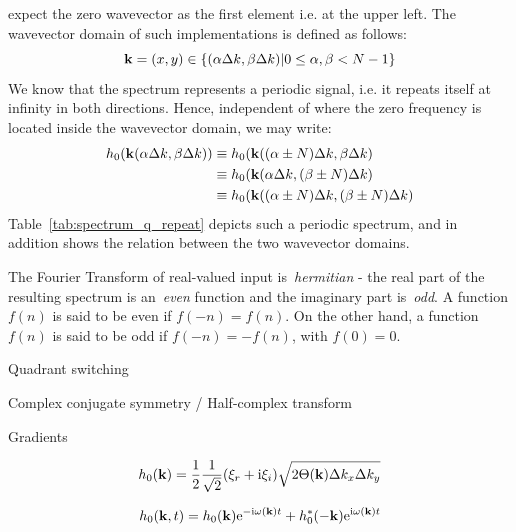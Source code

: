 expect the zero wavevector as the first element i.e. at the upper left. The wavevector domain
of such implementations is defined as follows:
\begin{equation*}
\mathbf{k} = (x,y)\in\{(\alpha\Delta k,\beta\Delta k)|
0\leq\alpha,\beta<N-1\}
\end{equation*}
We know that the spectrum represents a periodic signal, i.e. it repeats itself at infinity in both directions.
Hence, independent of where the zero frequency is located inside the wavevector domain, we may write:
\begin{align*}
 h_0(\mathbf{k}(\alpha\Delta k,\beta\Delta k)) &\equiv h_0(\mathbf{k}((\alpha\pm N)\Delta k, \beta\Delta k) \\
					     &\equiv h_0(\mathbf{k}(\alpha\Delta k, (\beta\pm N)\Delta k) \\
					     &\equiv h_0(\mathbf{k}((\alpha\pm N)\Delta k, (\beta\pm N)\Delta k)
\end{align*}
Table~\ref{tab:spectrum_q_repeat} depicts such a periodic spectrum, and in addition shows
the relation between the two wavevector domains.

The Fourier Transform of real-valued input is~\emph{hermitian} - the real part of the resulting spectrum
is an~\emph{even} function and the imaginary part is~\emph{odd}. A function $f(n)$ is said to be even if
$f(-n) = f(n)$. On the other hand, a function $f(n)$ is said to be odd if $f(-n) = -f(n)$,
with $f(0) = 0$.


Quadrant switching

Complex conjugate symmetry / Half-complex transform

Gradients



\begin{equation}
h_0(\mathbf{k}) =
\frac{1}{2}
\frac{1}{\sqrt{2}}(\xi_r+\mathrm{i}\xi_i)
\sqrt{2\Theta(\mathbf{k})\Delta k_x \Delta k_y}
\end{equation}

\begin{equation}
 h_0(\mathbf{k}, t) =
 h_0(\mathbf{k})\mathrm{e}^{-\mathrm{i}\omega(\mathbf{k})t}
 + h_0^\ast(\mathbf{-k})\mathrm{e}^{\mathrm{i}\omega(\mathbf{k})t}
\end{equation}

